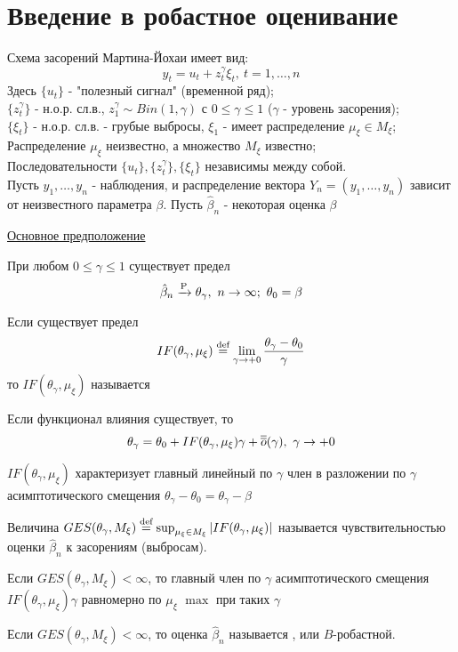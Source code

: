 \section{Введение в робастное оценивание}

Схема засорений Мартина-Йохаи имеет вид:
\[y_t = u_t + z^\gamma_t\xi_t,\ t = 1, \ldots, n\]
Здесь $\{u_t\}$ - "полезный сигнал" (временной ряд); \\
$\{z_t^\gamma\}$ - н.о.р. сл.в., $z_1^{\gamma} \sim Bin(1, \gamma)$
с $0 \leq \gamma\leq1$ ($\gamma$ - уровень засорения); \\
$\{\xi_t\}$ - н.о.р. сл.в. - грубые выбросы, $\xi_1$ - имеет распределение
$\mu_\xi\in M_\xi$;
Распределение $\mu_\xi$ неизвестно, а множество $M_\xi$ известно; \\
Последовательности $\{u_t\}, \{z^\gamma_t\}, \{\xi_t\}$ независимы между собой. \\
Пусть $y_1, \ldots, y_n$ - наблюдения, и распределение
вектора $Y_n=(y_1, \ldots, y_n)$ зависит от неизвестного параметра $\beta$.
Пусть $\hat{\beta}_n$ - некоторая оценка $\beta$

\underline{Основное предположение}

При любом $0 \leq \gamma\leq1$ существует предел
\[\hat{\beta}_n\xrightarrow{\P}\theta_\gamma,\ n\rightarrow\infty;\ \theta_0=\beta\]

\begin{definition}
    Если существует предел
    \[IF(\theta_\gamma, \mu_\xi)\stackrel{\text{def}}{=}\lim_{\gamma\rightarrow+0}\frac{\theta_\gamma-\theta_0}{\gamma}\]
    то $IF(\theta_\gamma, \mu_\xi)$ называется 
\end{definition}

Если функционал влияния существует, то 
\[\theta_\gamma = \theta_0 + IF(\theta_\gamma, \mu_\xi)\gamma + \overline{\overline{o}}(\gamma),\ \gamma\rightarrow+0\]
\begin{leftbar}
    $IF(\theta_\gamma, \mu_\xi)$ характеризует главный линейный по
    $\gamma$ член в разложении по $\gamma$ асимптотического смещения $\theta_\gamma - \theta_0=\theta_\gamma-\beta$
\end{leftbar}

\begin{definition}
    Величина $GES(\theta_\gamma,M_\xi)\stackrel{\text{def}}{=}\sup_{\mu_\xi\in M_\xi}\left\lvert IF(\theta_\gamma, \mu_\xi)\right\rvert$
    называется чувствительностью оценки $\widehat{\beta}_n$ к засорениям (выбросам).
\end{definition}
\begin{leftbar}
    Если $GES(\theta_\gamma,M_\xi)<\infty$, то главный член по $\gamma$
    асимптотического смещения $IF(\theta_\gamma,\mu_\xi)\gamma$
    равномерно по $\mu_\xi$ $\max$ при таких $\gamma$
\end{leftbar}
\begin{definition}
    Если $GES(\theta_\gamma,M_\xi)<\infty$, то оценка $\widehat{\beta}_n$
    называется , или $B$-робастной.
\end{definition}

